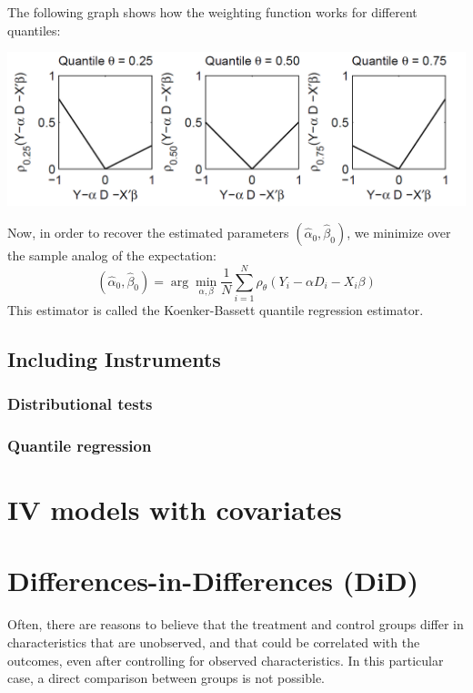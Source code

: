 \documentclass[12pt]{report}
\begin{document}
The following graph shows how the weighting function works for different quantiles:\begin{center}
 \includegraphics[scale=0.4]{images/quantilereg.PNG}
\end{center} 

Now, in order to recover the estimated parameters $(\hat\alpha_0, \hat\beta_0)$, we minimize over the sample analog of the expectation: $$ (\hat\alpha_0, \hat\beta_0) = \arg\min_{\alpha, \beta} \frac{1}{N}\sum_{i=1}^{N}\rho_\theta(Y_i - \alpha D_i - X_i\beta) $$ This estimator is called the Koenker-Bassett quantile regression estimator.

\subsection{Including Instruments}

\subsubsection{Distributional tests}



\subsubsection{Quantile regression}



\section{IV models with covariates}



\section{Differences-in-Differences (DiD)}

Often, there are reasons to believe that the treatment and control groups differ in characteristics that are unobserved, and that could be correlated with the outcomes, even after controlling for observed characteristics. In this particular case, a direct comparison between groups is not possible.
\end{document}
